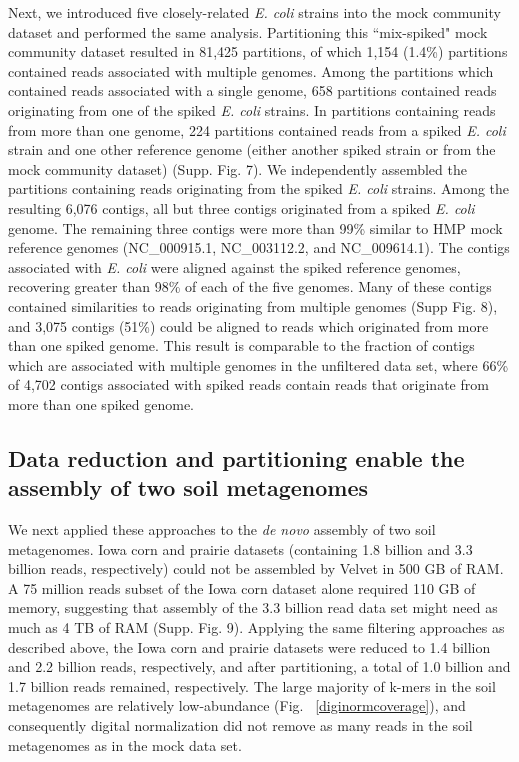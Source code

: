\documentclass[11pt]{article} %
\begin{document}
Next, we introduced five closely-related \emph{E. coli} strains into the mock
community dataset and performed the same analysis.
Partitioning this ``mix-spiked" mock community
dataset resulted in 81,425 partitions, of which 1,154 (1.4\%)
partitions contained reads associated with multiple genomes.  Among
the partitions which contained reads associated with a single genome,
658 partitions contained reads originating from one of the spiked
\emph{E. coli} strains.  In partitions containing reads from more than
one genome, 224 partitions contained reads from a spiked
\emph{E. coli} strain and one other reference genome (either another
spiked strain or from the mock community dataset) (Supp. Fig. 7).  We
independently assembled the partitions containing reads originating
from the spiked \emph{E. coli} strains.  Among the resulting 6,076
contigs, all but three contigs originated from a spiked \emph{E. coli}
genome.  The remaining three contigs were more than 99\% similar to
HMP mock reference genomes (NC\_000915.1, NC\_003112.2, and
NC\_009614.1).  The contigs associated with \emph{E. coli} were
aligned against the spiked reference genomes, recovering greater than
98\% of each of the five genomes.  Many of these contigs contained
similarities to reads originating from multiple genomes (Supp Fig. 8),
and 3,075 contigs (51\%) could be aligned to reads which originated from
more than one spiked genome.  This result is comparable to the
fraction of contigs which are associated with multiple genomes in the
unfiltered data set, where 66\% of 4,702 contigs associated with
spiked reads contain reads that originate from more than one spiked
genome.

\subsection{Data reduction and partitioning enable the assembly of two soil metagenomes}

We next applied these approaches to the {\em de novo} assembly of two
soil metagenomes.  Iowa corn and prairie datasets (containing 1.8
billion and 3.3 billion reads, respectively) could not be assembled by
Velvet in 500 GB of RAM.  A 75 million reads subset of the Iowa corn
dataset alone required 110 GB of memory, suggesting that assembly of
the 3.3 billion read data set might need as much as 4 TB of RAM
(Supp. Fig. 9).  Applying the same filtering approaches as described
above, the Iowa corn and prairie datasets were reduced to 1.4 billion
and 2.2 billion reads, respectively, and after partitioning, a total
of 1.0 billion and 1.7 billion reads remained, respectively.  The
large majority of k-mers in the soil metagenomes are relatively
low-abundance (Fig. ~\ref{diginormcoverage}), and consequently digital
normalization did not remove as many reads in the soil metagenomes as
in the mock data set.
\end{document}
